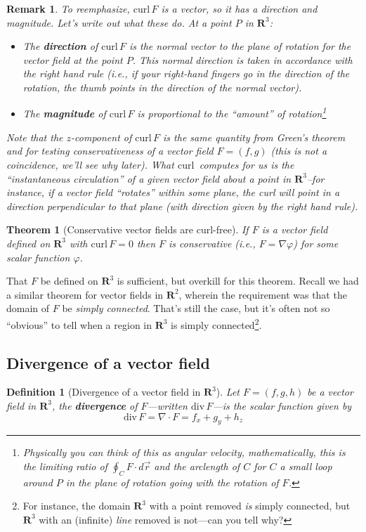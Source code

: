 \documentclass[12pt]{article}
\numberwithin{equation}{subsection}
\numberwithin{figure}{subsection}
\newtheorem{thm}[subsection]{Theorem}
\newtheorem{defn}[subsection]{Definition}
\theoremstyle{note}
\newtheorem{remark}[subsection]{Remark}
\newcommand{\curl}{\mathrm{curl\,}}
\newcommand{\dv}{\mathrm{div\,}}
\begin{document}
{\begin{remark}
To reemphasize, $\curl F$ is a \textit{vector}, so it has a direction and magnitude. Let's write out what these do. At a point $P$ in $\mathbf{R}^3$:
\begin{itemize}
	\item The \textbf{direction} of $\curl F$ is the normal vector to the plane of rotation for the vector field at the point $P$. This normal direction is taken in accordance with the \textit{right hand rule} (i.e., if your right-hand fingers go in the direction of the rotation, the thumb points in the direction of the normal vector).
	\item The \textbf{magnitude} of $\curl F$ is proportional to the ``amount'' of rotation\footnote{Physically you can think of this as angular velocity, mathematically, this is the limiting ratio of $\oint_C F\cdot d\vec{r}$ and the arclength of $C$ for $C$ a small loop around $P$ in the plane of rotation going \textit{with} the rotation of $F$.}
\end{itemize}
Note that the $z$-component of $\curl F$ is the same quantity from Green's theorem and for testing conservativeness of a vector field $F=(f,g)$ (this is not a coincidence, we'll see why later). What $\curl$ computes for us is the ``instantaneous circulation'' of a given vector field about a point in $\mathbf{R}^3$--for instance, if a vector field ``rotates'' within some plane, the curl will point in a direction perpendicular to that plane (with direction given by the right hand rule).
\end{remark}

\begin{thm}[Conservative vector fields are curl-free] If $F$ is a vector field defined on $\mathbf{R}^3$ with $\curl F=0$ then $F$ is conservative (i.e., $F=\nabla \varphi$) for some scalar function $\varphi$. 
\end{thm}
That $F$ be defined on $\mathbf{R}^3$ is sufficient, but overkill for this theorem. Recall we had a similar theorem for vector fields in $\mathbf{R}^2$, wherein the requirement was that the domain of $F$ be \textit{simply connected}. That's still the case, but it's often not so ``obvious'' to tell when a region in $\mathbf{R}^3$ is simply connected\footnote{For instance, the domain $\mathbf{R}^3$ with a point removed \textit{is} simply connected, but $\mathbf{R}^3$ with an (infinite) \textit{line} removed is not---can you tell why?}.


\subsection{Divergence of a vector field}
\begin{defn}[Divergence of a vector field in $\mathbf{R}^3$] Let $F=(f,g,h)$ be a vector field in $\mathbf{R}^3$, the \textbf{divergence} of $F$---written $\dv F$---is the scalar function given by \begin{equation} \label{div} \dv F =\nabla \cdot F= f_x+g_y+h_z \end{equation}
\end{defn}

}
\end{document}
